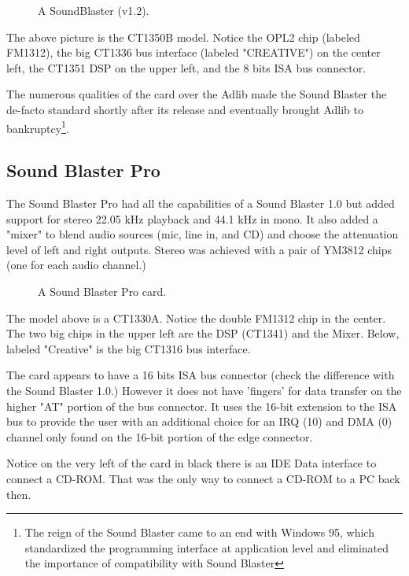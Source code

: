 \documentclass[book.tex]{subfiles}
\begin{document}
\begin{figure}[H] 
  \centering 
  \caption{A SoundBlaster (v1.2). }
\end{figure}
\par
The above picture is the CT1350B model. Notice the OPL2 chip (labeled FM1312), the big CT1336 bus interface (labeled "CREATIVE") on the center left, the CT1351 DSP on the upper left, and the 8 bits ISA bus connector.\\
\par
   The numerous qualities of the card over the Adlib made the Sound Blaster the de-facto standard shortly after its release and eventually brought Adlib to bankruptcy\footnote{The reign of the Sound Blaster came to an end with Windows 95, which standardized the programming interface at application level and eliminated the importance of compatibility with Sound Blaster}.





  \subsection{Sound Blaster Pro}
The Sound Blaster Pro had all the capabilities of a Sound Blaster 1.0 but added support for stereo 22.05 kHz playback and 44.1 kHz in mono. It also added a "mixer" to blend audio sources (mic, line in, and CD) and choose the attenuation level of left and right outputs. Stereo was achieved with a pair of YM3812 chips (one for each audio channel.)\\\label{sbmixerpage}
\begin{figure}[H] 
  \centering 
  \caption{A Sound Blaster Pro card.}
\end{figure}
The model above is a CT1330A. Notice the double FM1312 chip in the center. The two big chips in the upper left are the DSP (CT1341) and the Mixer. Below, labeled "Creative" is the big CT1316 bus interface.\\
\par
{} The card appears to have a 16 bits ISA bus connector (check the difference with the Sound Blaster 1.0.) However it does not have 'fingers' for data transfer on the higher "AT" portion of the bus connector. It uses the 16-bit extension to the ISA bus to provide the user with an additional choice for an IRQ (10) and DMA (0) channel only found on the 16-bit portion of the edge connector.\\
\par
{} Notice on the very left of the card in black there is an IDE Data interface to connect a CD-ROM. That was the only way to connect a CD-ROM to a PC back then.
\end{document}
